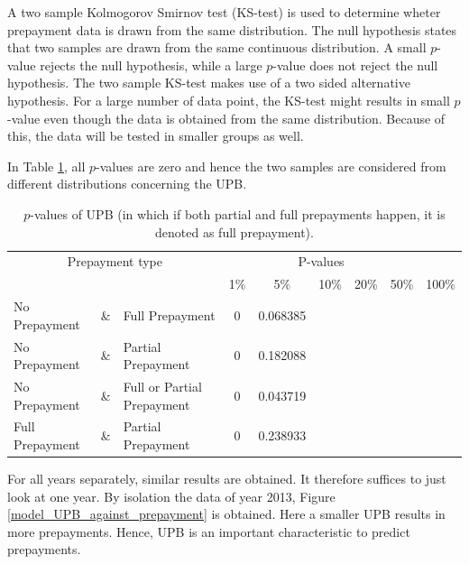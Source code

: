         \noindent
        A two sample Kolmogorov Smirnov test (KS-test) is used to
        determine wheter prepayment data is drawn from the same
        distribution. The null hypothesis states that two samples
        are drawn from the same continuous distribution. A small
        $p$-value rejects the null hypothesis, while a large
        $p$-value does not reject the null hypothesis. The two
        sample KS-test makes use of a two sided alternative
        hypothesis. For a large number of data point, the KS-test
        might results in small $p$-value even though the data is
        obtained from the same distribution. Because of this, the
        data will be tested in smaller groups as well. 
        
        In Table \ref{model_Pvals_of_UPB}, all $p$-values are zero and hence 
        the two samples are considered from different 
        distributions concerning the UPB. 
        \begin{table}[H]
        \centering
            \begin{tabular}{lcl|c|c|c|c|c|c}
                \multicolumn{3}{c|}{Prepayment type} 
                & \multicolumn{5}{c}{P-values}& \\
                &&&1\%&5\%&10\%&20\%&50\%&100\%\\\hline
                No Prepayment & \& & Full Prepayment & 0 & 0.068385\\
                No Prepayment & \& & Partial Prepayment & 0 & 0.182088\\
                No Prepayment & \& & Full or Partial Prepayment & 0 & 0.043719 \\
                Full Prepayment & \& & Partial Prepayment & 0 & 0.238933
		    \end{tabular}
            \caption{
                $p$-values of UPB (in which if both partial and full 
                prepayments happen, it is denoted as full prepayment).
                }
	        \label{model_Pvals_of_UPB}
        \end{table}
        For all years separately, similar results are obtained.
        It therefore suffices to just look at one year.  
        By isolation the data of year 2013, Figure 
        \ref{model_UPB_against_prepayment} is obtained. Here a smaller 
        UPB results in more prepayments. Hence, UPB is an 
        important characteristic to predict prepayments. 
